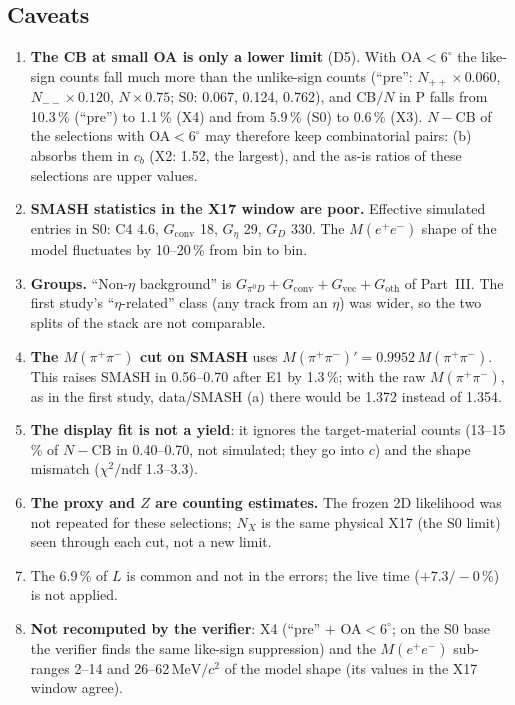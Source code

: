\documentclass[11pt,a4paper]{article}
\newcommand{\Mee}{\ensuremath{M(e^{+}e^{-})}\xspace}
\newcommand{\Mpipi}{\ensuremath{M(\pi^{+}\pi^{-})}\xspace}
\newcommand{\MeVcc}{\ensuremath{\mathrm{MeV}/c^{2}}\xspace}
\newcommand{\Geta}{\ensuremath{G_\eta}\xspace}
\newcommand{\cs}[1]{\textsf{#1}}%
\begin{document}
\subsection{Caveats}
\label{sec:e1cav}
\begin{enumerate}\setlength{\itemsep}{1pt}
\item \textbf{The CB at small OA is only a lower limit} (D5). With OA$<6^\circ$ the like-sign counts fall much more than the unlike-sign counts (``pre'':
      $N_{++}\times0.060$, $N_{--}\times0.120$, $N\times0.75$; S0: 0.067, 0.124, 0.762), and CB$/N$ in P falls from 10.3\,\% (``pre'') to 1.1\,\%
      (\cs{X4}) and from 5.9\,\% (S0) to 0.6\,\% (\cs{X3}). $N-\mathrm{CB}$ of the selections with OA$<6^\circ$ may therefore keep combinatorial
      pairs: (b) absorbs them in $c_b$ (\cs{X2}: 1.52, the largest), and the as-is ratios of these selections are upper values.
\item \textbf{SMASH statistics in the X17 window are poor.} Effective simulated entries in S0: C4 4.6, $G_{\mathrm{conv}}$ 18, \Geta 29, $G_D$ 330.
      The \Mee shape of the model fluctuates by 10--20\,\% from bin to bin.
\item \textbf{Groups.} ``Non-$\eta$ background'' is $G_{\pi^0D}+G_{\mathrm{conv}}+G_{\mathrm{vec}}+G_{\mathrm{oth}}$ of Part~III. The first study's
      ``$\eta$-related'' class (any track from an $\eta$) was wider, so the two splits of the stack are not comparable.
\item \textbf{The \Mpipi cut on SMASH} uses $\Mpipi'=0.9952\,\Mpipi$. This raises SMASH in 0.56--0.70 after \cs{E1} by 1.3\,\%; with the raw \Mpipi,
      as in the first study, data/SMASH (a) there would be 1.372 instead of 1.354.
\item \textbf{The display fit is not a yield}: it ignores the target-material counts (13--15\,\% of $N-\mathrm{CB}$ in 0.40--0.70, not simulated;
      they go into $c$) and the shape mismatch ($\chi^2/\mathrm{ndf}$ 1.3--3.3).
\item \textbf{The proxy and $Z$ are counting estimates.} The frozen 2D likelihood was not repeated for these selections; $N_X$ is the same physical
      X17 (the S0 limit) seen through each cut, not a new limit.
\item The 6.9\,\% of $L$ is common and not in the errors; the live time ($+7.3/-0$\,\%) is not applied.
\item \textbf{Not recomputed by the verifier}: \cs{X4} (``pre'' + OA$<6^\circ$; on the S0 base the verifier finds the same like-sign suppression) and
      the \Mee sub-ranges 2--14 and 26--62\,\MeVcc of the model shape (its values in the X17 window agree).
\end{enumerate}
\end{document}
